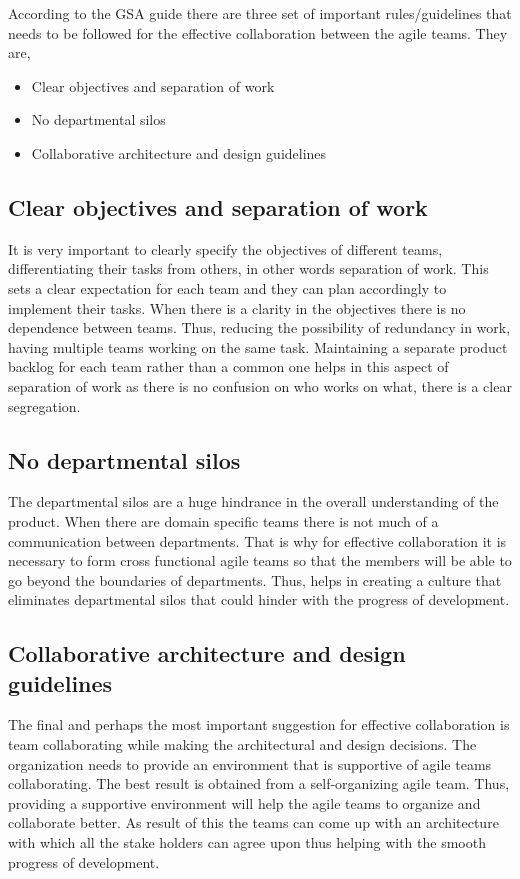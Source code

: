 \documentclass[sigconf]{acmart}
\begin{document}
According to the GSA guide \cite{Gsa01} there are three set of important rules/guidelines that needs to be followed for the effective collaboration between the agile teams. They are,

\begin{itemize}
  \item Clear objectives and separation of work
  \item No departmental silos
  \item Collaborative architecture and design guidelines
\end{itemize}
\subsection{Clear objectives and separation of work}

It is very important to clearly specify the objectives of different teams, differentiating their tasks from others, in other words separation of work. This sets a clear expectation for each team and they can plan accordingly to implement their tasks. When there is a clarity in the objectives there is no dependence between teams. Thus, reducing the possibility of redundancy in work, having multiple teams working on the same task. Maintaining a separate product backlog for each team rather than a common one helps in this aspect of separation of work as there is no confusion on who works on what, there is a clear segregation.

\subsection{No departmental silos}
The departmental silos are a huge hindrance in the overall understanding of the product. When there are domain specific teams there is not much of a communication between departments. That is why for effective collaboration it is necessary to form cross functional agile teams so that the members will be able to go beyond the boundaries of departments. Thus, helps in creating a culture that eliminates departmental silos that could hinder with the progress of development.

\subsection {Collaborative architecture and design guidelines}
The final and perhaps the most important suggestion for effective collaboration is team collaborating while making the architectural and design decisions. The organization needs to provide an environment that is supportive of agile teams collaborating. The best result is obtained from a self-organizing agile team. Thus, providing a supportive environment will help the agile teams to organize and collaborate better. As result of this the teams can come up with an architecture with which all the stake holders can agree upon thus helping with the smooth progress of development.
\end{document}
